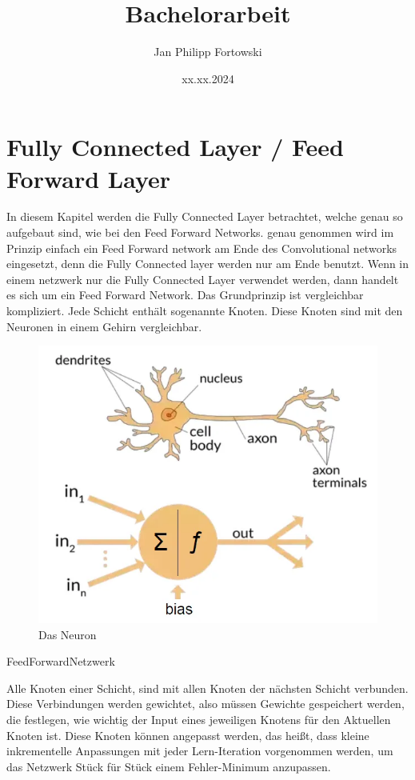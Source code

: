 \documentclass[12pt]{article}
\title{\textbf{Bachelorarbeit}}
\author{Jan Philipp Fortowski}
\date{xx.xx.2024}
\begin{document}
\maketitle
\thispagestyle{empty}
\cleardoublepage
\tableofcontents
\thispagestyle{empty}
\cleardoublepage



\section{Fully Connected Layer / Feed Forward Layer}
In diesem Kapitel werden die Fully Connected Layer betrachtet, welche genau so aufgebaut sind, wie bei den Feed Forward Networks. genau genommen wird im Prinzip einfach ein Feed Forward network am Ende des Convolutional networks eingesetzt, denn die Fully Connected layer werden nur am Ende benutzt. Wenn in einem netzwerk nur die Fully Connected Layer verwendet werden, dann handelt es sich um ein Feed Forward Network. 
Das Grundprinzip ist vergleichbar kompliziert. Jede Schicht enthält sogenannte Knoten. Diese Knoten sind mit den Neuronen in einem Gehirn vergleichbar.

\begin{figure}[H]
\centering
\includegraphics[scale=0.40]{./Images/BA_001_DasNeuron.png}
\caption{Das Neuron}
\label{Was kommt hier rein?}
\end{figure}

FeedForwardNetzwerk

Alle Knoten einer Schicht, sind mit allen Knoten der nächsten Schicht verbunden. Diese Verbindungen werden gewichtet, also müssen Gewichte gespeichert werden, die festlegen, wie wichtig der Input eines jeweiligen Knotens für den Aktuellen Knoten ist. Diese Knoten können angepasst werden, das heißt, dass kleine inkrementelle Anpassungen mit jeder Lern-Iteration vorgenommen werden, um das Netzwerk Stück für Stück einem Fehler-Minimum anzupassen. 
\end{document}
